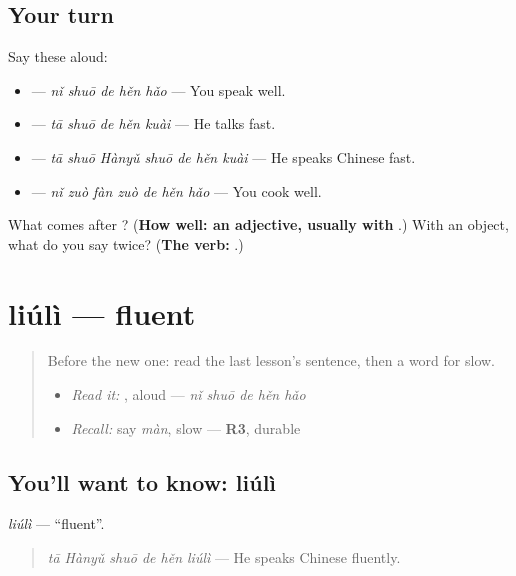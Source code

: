 \subsection*{Your turn}
Say these aloud:

\begin{itemize}
\raggedright
  \item {} — \emph{nǐ shuō de hěn hǎo} — You speak well.
  \item {} — \emph{tā shuō de hěn kuài} — He talks fast.
  \item {} — \emph{tā shuō Hànyǔ shuō de hěn kuài} — He speaks Chinese fast.
  \item {} — \emph{nǐ zuò fàn zuò de hěn hǎo} — You cook well.
\end{itemize}

\begin{tcolorbox}[breakable,colback=teal!4,colframe=teal!35!black,title={Before you move on}]
What comes after ? (\textbf{How well: an adjective, usually with }.) With an object, what do you say twice? (\textbf{The verb: }.)
\end{tcolorbox}
\section[liúlì]{liúlì — fluent}

\label{lesson:ZH-C152-liuli}



\begin{quote}
Before the new one: read the last lesson's sentence, then a word for slow.

\begin{itemize}
\raggedright
  \item \emph{Read it:} , aloud — \emph{nǐ shuō de hěn hǎo}
  \item \emph{Recall:} say \emph{màn}, slow — \textbf{R3}, durable
\end{itemize}
\end{quote}

\subsection*{You'll want to know: liúlì}
\emph{liúlì} — \textquotedblleft{}fluent\textquotedblright{}.

\begin{quote}
\emph{tā Hànyǔ shuō de hěn liúlì} — He speaks Chinese fluently.
\end{quote}

